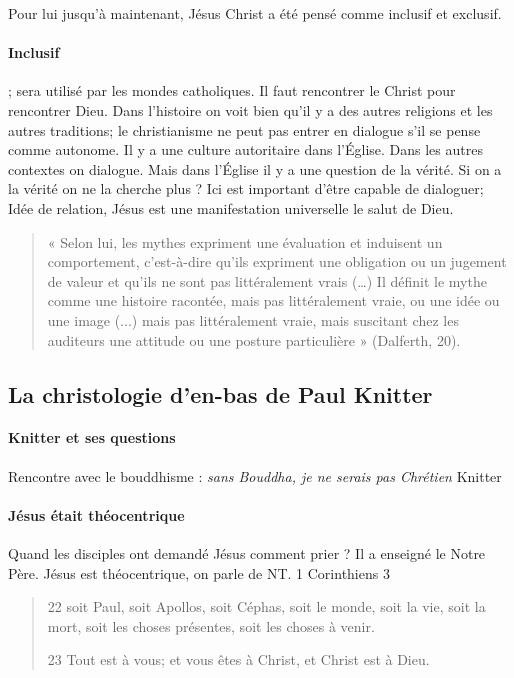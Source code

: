 	Pour lui jusqu’à maintenant, Jésus Christ a été pensé comme inclusif et exclusif. 
	\paragraph{Inclusif} ; sera utilisé par les mondes catholiques. Il faut rencontrer le Christ pour rencontrer Dieu. Dans l’histoire on voit bien qu’il y a des autres religions et les autres traditions; le christianisme ne peut pas entrer en dialogue s'il se pense comme autonome. Il y a une culture autoritaire dans l’Église. Dans les autres contextes on dialogue. Mais dans l’Église il y a une question de la vérité. Si on a la vérité on ne la cherche plus ? Ici est important d’être capable de dialoguer; Idée de relation, Jésus est une manifestation universelle le salut de Dieu. 

 
\begin{quote}
    « Selon lui, les mythes expriment une évaluation et induisent un comportement, c’est-à-dire qu’ils expriment une obligation ou un jugement de valeur et qu’ils ne sont pas littéralement vrais (…) Il définit le mythe comme une histoire racontée, mais pas littéralement vraie, ou une idée ou une image (...)  mais pas littéralement vraie, mais suscitant chez les auditeurs une attitude ou une posture particulière » (Dalferth, 20).
\end{quote}
	



\subsection{La christologie d’en-bas de Paul Knitter }

\paragraph{Knitter et ses questions } Rencontre avec le bouddhisme : \textit{sans Bouddha, je ne serais pas Chrétien} Knitter

\paragraph{Jésus était théocentrique} 
	Quand les disciples ont demandé Jésus comment prier ? Il a enseigné le Notre Père. Jésus est théocentrique, on parle de NT. 
	1 Corinthiens 3
	\begin{quote}
	    22 soit Paul, soit Apollos, soit Céphas, soit le monde, soit la vie, soit la mort, soit les choses présentes, soit les choses à venir.

23 Tout est à vous; et vous êtes à Christ, et Christ est à Dieu.
	\end{quote}
